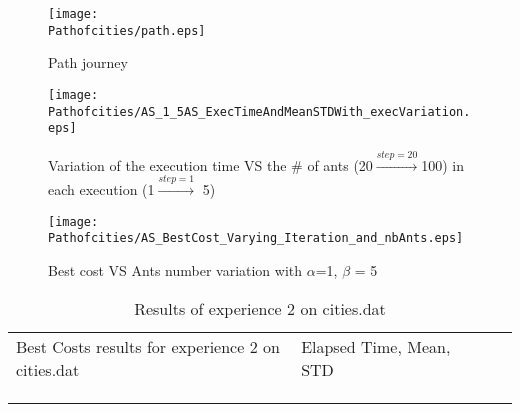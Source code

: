 \begin{figure}[H]
	\begin{minipage}[t]{0.45\linewidth}
	\centering
	\texttt{[image: \\Pathofcities/path.eps]}
	\caption{Path journey}\label{fig:Pathofcities:path}
	
	\end{minipage}\hfill
	\begin{minipage}[t]{0.45\linewidth}
	\centering
	\texttt{[image: \\Pathofcities/AS\_1\_5AS\_ExecTimeAndMeanSTDWith\_execVariation.eps]}
	\caption{Variation of the execution time VS the \# of ants (20$\stackrel{step=20}{\rightarrow}$100) in each execution (1$\stackrel{step=1}{\rightarrow}$ 5)}
	\label{fig:Pathofcities:AS_1_5AS_ExecTimeAndMeanSTDWith_execVariation}
	\end{minipage}
	\flushleft
	\begin{minipage}[t]{0.45\linewidth}
	\centering
	\texttt{[image: \\Pathofcities/AS\_BestCost\_Varying\_Iteration\_and\_nbAnts.eps]}
	\caption{Best cost VS Ants number variation with $\alpha$=1, $ \beta $ = 5}
	\label{fig:Pathofcities:AS_BestCost_Varying_Iteration_and_nbAnts}
	\end{minipage}
\end{figure}\flushright
	\begin{minipage}[t]{0.9\linewidth}
	\vspace{-9mm}
	\begin{table}[H]
	\label{tab:Pathofcities:expdeux}
	\begin{tabular}{lllll}
	\cline{1-2}
	\multicolumn{1}{|l|}{Best Costs results for experience 2 on cities.dat }                                                           &  \multicolumn{1}{l|}{Elapsed Time, Mean, STD}                                             &  &  &  \\ \cline{1-2}
	\multicolumn{1}{|l|}{} & \multicolumn{1}{l|}{ } &  &  &  \\ \cline{1-2}
	&     &  &  &  \\
	&     &  &  & 
	\end{tabular}
	\caption{Results of experience 2 on cities.dat}
	\end{table}
	\end{minipage}

